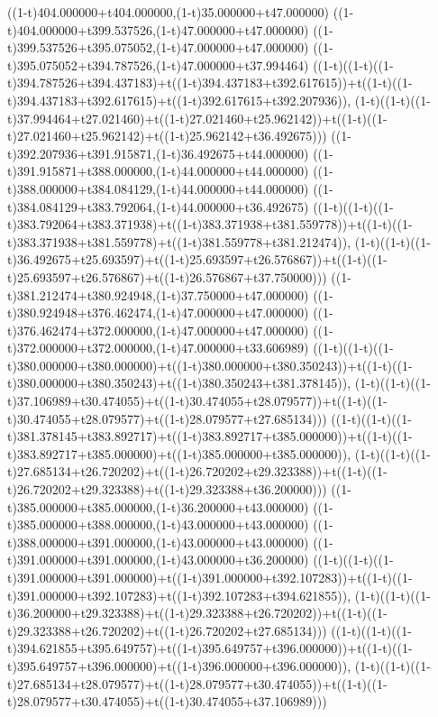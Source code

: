 ((1-t)404.000000+t404.000000,(1-t)35.000000+t47.000000)
((1-t)404.000000+t399.537526,(1-t)47.000000+t47.000000)
((1-t)399.537526+t395.075052,(1-t)47.000000+t47.000000)
((1-t)395.075052+t394.787526,(1-t)47.000000+t37.994464)
((1-t)((1-t)((1-t)394.787526+t394.437183)+t((1-t)394.437183+t392.617615))+t((1-t)((1-t)394.437183+t392.617615)+t((1-t)392.617615+t392.207936)),                                     (1-t)((1-t)((1-t)37.994464+t27.021460)+t((1-t)27.021460+t25.962142))+t((1-t)((1-t)27.021460+t25.962142)+t((1-t)25.962142+t36.492675)))
((1-t)392.207936+t391.915871,(1-t)36.492675+t44.000000)
((1-t)391.915871+t388.000000,(1-t)44.000000+t44.000000)
((1-t)388.000000+t384.084129,(1-t)44.000000+t44.000000)
((1-t)384.084129+t383.792064,(1-t)44.000000+t36.492675)
((1-t)((1-t)((1-t)383.792064+t383.371938)+t((1-t)383.371938+t381.559778))+t((1-t)((1-t)383.371938+t381.559778)+t((1-t)381.559778+t381.212474)),                                     (1-t)((1-t)((1-t)36.492675+t25.693597)+t((1-t)25.693597+t26.576867))+t((1-t)((1-t)25.693597+t26.576867)+t((1-t)26.576867+t37.750000)))
((1-t)381.212474+t380.924948,(1-t)37.750000+t47.000000)
((1-t)380.924948+t376.462474,(1-t)47.000000+t47.000000)
((1-t)376.462474+t372.000000,(1-t)47.000000+t47.000000)
((1-t)372.000000+t372.000000,(1-t)47.000000+t33.606989)
((1-t)((1-t)((1-t)380.000000+t380.000000)+t((1-t)380.000000+t380.350243))+t((1-t)((1-t)380.000000+t380.350243)+t((1-t)380.350243+t381.378145)),                                     (1-t)((1-t)((1-t)37.106989+t30.474055)+t((1-t)30.474055+t28.079577))+t((1-t)((1-t)30.474055+t28.079577)+t((1-t)28.079577+t27.685134)))
((1-t)((1-t)((1-t)381.378145+t383.892717)+t((1-t)383.892717+t385.000000))+t((1-t)((1-t)383.892717+t385.000000)+t((1-t)385.000000+t385.000000)),                                     (1-t)((1-t)((1-t)27.685134+t26.720202)+t((1-t)26.720202+t29.323388))+t((1-t)((1-t)26.720202+t29.323388)+t((1-t)29.323388+t36.200000)))
((1-t)385.000000+t385.000000,(1-t)36.200000+t43.000000)
((1-t)385.000000+t388.000000,(1-t)43.000000+t43.000000)
((1-t)388.000000+t391.000000,(1-t)43.000000+t43.000000)
((1-t)391.000000+t391.000000,(1-t)43.000000+t36.200000)
((1-t)((1-t)((1-t)391.000000+t391.000000)+t((1-t)391.000000+t392.107283))+t((1-t)((1-t)391.000000+t392.107283)+t((1-t)392.107283+t394.621855)),                                     (1-t)((1-t)((1-t)36.200000+t29.323388)+t((1-t)29.323388+t26.720202))+t((1-t)((1-t)29.323388+t26.720202)+t((1-t)26.720202+t27.685134)))
((1-t)((1-t)((1-t)394.621855+t395.649757)+t((1-t)395.649757+t396.000000))+t((1-t)((1-t)395.649757+t396.000000)+t((1-t)396.000000+t396.000000)),                                     (1-t)((1-t)((1-t)27.685134+t28.079577)+t((1-t)28.079577+t30.474055))+t((1-t)((1-t)28.079577+t30.474055)+t((1-t)30.474055+t37.106989)))
